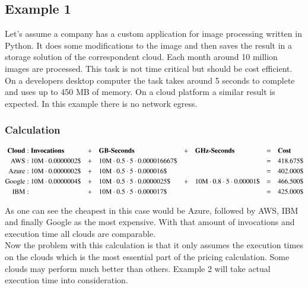 \subsection*{Example 1}
Let's assume a company has a custom application for image processing written in Python. It does some modifications to the image and then saves the result in a storage solution of the correspondent cloud. Each month around 10 million images are processed. This task is not time critical but should be cost efficient. On a developers desktop computer the task takes around 5 seconds to complete and uses up to 450 \gls{MB} of memory. On a cloud platform a similar result is expected. In this example there is no network egress.
\subsubsection*{Calculation}
\begin{align*}
\text{\textbf{Cloud}}&: \text{\textbf{Invocations}} &+\quad& \text{\textbf{GB-Seconds}} &+\quad& \text{\textbf{GHz-Seconds}} &=\quad& \text{\textbf{Cost}} \\
\text{AWS}&: 10\text{M} \cdot 0.0000002 \$ &+\quad& 10\text{M} \cdot 0.5 \cdot 5 \cdot 0.000016667 \$ & & &=\quad& 418.675 \$ \\ 
\text{Azure}&: 10\text{M} \cdot 0.0000002 \$ &+\quad& 10\text{M} \cdot 0.5 \cdot 5 \cdot 0.000016 \$ & & &=\quad& 402.000 \$ \\
\text{Google}&: 10\text{M} \cdot 0.0000004 \$ &+\quad& 10\text{M} \cdot 0.5 \cdot 5 \cdot 0.0000025 \$ &+\quad&  10\text{M} \cdot 0.8 \cdot 5 \cdot 0.00001 \$ &=\quad& 466.500 \$ \\
\text{IBM}&:  &+\quad& 10\text{M} \cdot 0.5 \cdot 5 \cdot 0.000017 \$ & & &=\quad& 425.000 \$ \\ 
\end{align*}

As one can see the cheapest in this case would be Azure, followed by \gls{AWS}, \gls{IBM} and finally Google as the most expensive. With that amount of invocations and execution time all clouds are comparable.\\
Now the problem with this calculation is that it only assumes the execution times on the clouds which is the most essential part of the pricing calculation. Some clouds may perform much better than others. Example 2 will take actual execution time into consideration.
